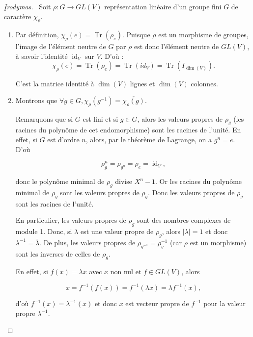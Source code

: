 \documentclass[french]{book}
\theoremstyle{definition}
\theoremstyle{remark}
\begin{document}
\begin{proof}[\k{I}rodymas]

  \
  Soit \(\rho : G \longrightarrow GL(V)\) représentation linéaire d'un groupe fini \(G\) de caractère \(\chi _{\rho}\).
  \begin{enumerate}
    \item Par définition, \(\chi _{\rho}(e) = \operatorname{Tr}(\rho_e) \). Puisque \(\rho\) est un morphisme de groupes, l'image de l'élément neutre de \(G\) par \(\rho\) est donc l'élément neutre de \(GL(V)\), à savoir l'identité \(\operatorname{id}_V\) sur \(V\). D'où : \[\chi _{\rho}(e) = \operatorname{Tr}(\rho_e) = \operatorname{Tr}(id_V) = \operatorname{Tr}(I _{\operatorname{dim}(V)}). \]

    C'est la matrice identité à \(\operatorname{dim}(V)\) lignes et \(\operatorname{dim}(V)\) colonnes.

    \item Montrons que \(\forall g \in G, \chi _{\rho}(g ^{-1} ) = \overline{\chi _{\rho}(g)}\).

    Remarquons que si \(G\) est fini et si \(g \in G\), alors les valeurs propres de \(\rho_g\) (les racines du polynôme de cet endomorphisme) sont les racines de l'unité. En effet, si \(G\) est d'ordre \(n\), alors, par le théorème de Lagrange, on a \(g ^{n} = e\). D'où

    \[\rho_g ^{n} = \rho _{g ^{n}} = \rho_e = \operatorname{id}_V,\]

    donc le polynôme minimal de \(\rho_g\) divise \(X ^{n}-1\). Or les racines du polynôme minimal de \(\rho_g\) sont les valeurs propres de \(\rho_g\). Donc les valeurs propres de \(\rho_g\) sont les racines de l'unité.

    En particulier, les valeurs propres de \(\rho_g\) sont des nombres complexes de module 1. Donc, si \(\lambda \) est une valeur propre de \(\rho_g\), alors \(\lvert \lambda  \rvert = 1\) et donc \(\lambda  ^{-1} = \overline{\lambda }\). De plus, les valeurs propres de \(\rho _{g ^{-1}} = \rho _{g} ^{-1} \) (car \(\rho\) est un morphisme) sont les inverses de celles de \(\rho_g\).

    En effet, si \(f(x) = \lambda x\) avec \(x\) non nul et \(f \in GL(V)\), alors

    \[x =  f ^{-1} (f(x)) = f ^{-1} (\lambda x) = \lambda f ^{-1} (x),\]

    d'où \(f ^{-1} (x) = \lambda ^{-1} (x)\) et donc \(x\) est vecteur propre de \(f ^{-1} \) pour la valeur propre \(\lambda ^{-1} \).


\end{enumerate}
\end{proof}
\end{document}
